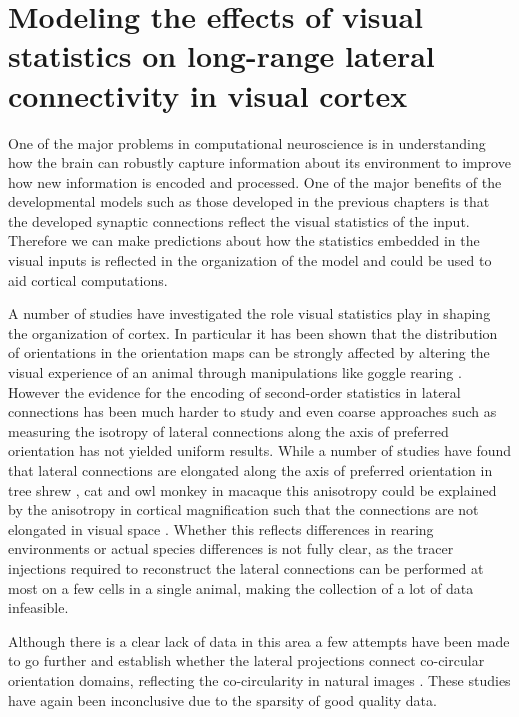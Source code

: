 \chapter{Modeling the effects of visual statistics on long-range lateral connectivity in visual cortex}

One of the major problems in computational neuroscience is in
understanding how the brain can robustly capture information about its
environment to improve how new information is encoded and
processed. One of the major benefits of the developmental models such
as those developed in the previous chapters is that the developed
synaptic connections reflect the visual statistics of the
input. Therefore we can make predictions about how the statistics
embedded in the visual inputs is reflected in the organization of the
model and could be used to aid cortical computations.

A number of studies have investigated the role visual statistics play
in shaping the organization of cortex. In particular it has been shown
that the distribution of orientations in the orientation maps can be
strongly affected by altering the visual experience of an animal
through manipulations like goggle rearing \cite{Tanaka2006}. However
the evidence for the encoding of second-order statistics in lateral
connections has been much harder to study and even coarse approaches
such as measuring the isotropy of lateral connections along the axis
of preferred orientation has not yielded uniform results. While a
number of studies have found that lateral connections are elongated
along the axis of preferred orientation in tree shrew
\citep{Bosking1997}, cat \citep{Schmidt1997} and owl monkey
\citep{Sincich2001} in macaque this anisotropy could be explained by
the anisotropy in cortical magnification such that the connections are
not elongated in visual space \citep{Angelucci2002}.  Whether this
reflects differences in rearing environments or actual species
differences is not fully clear, as the tracer injections required to
reconstruct the lateral connections can be performed at most on a few
cells in a single animal, making the collection of a lot of data
infeasible.

Although there is a clear lack of data in this area a few attempts
have been made to go further and establish whether the lateral
projections connect co-circular orientation domains, reflecting the
co-circularity in natural images \citep{Hunt2011}. These studies have
again been inconclusive due to the sparsity of good quality data.


